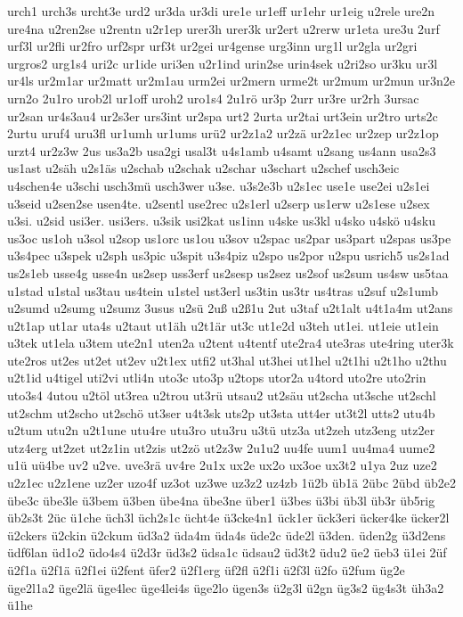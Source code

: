 {urch1
urch3s
urcht3e
urd2
ur3da
ur3di
ure1e
ur1eff
ur1ehr
ur1eig
u2rele
ure2n
ure4na
u2ren2se
u2rentn
u2r1ep
urer3h
urer3k
ur2ert
u2rerw
ur1eta
ure3u
2urf
urf3l
ur2fli
ur2fro
urf2spr
urf3t
ur2gei
ur4gense
urg3inn
urg1l
ur2gla
ur2gri
urgros2
urg1s4
uri2c
ur1ide
uri3en
u2r1ind
urin2se
urin4sek
u2ri2so
ur3ku
ur3l
ur4ls
ur2m1ar
ur2matt
ur2m1au
urm2ei
ur2mern
urme2t
ur2mum
ur2mun
ur3n2e
urn2o
2u1ro
urob2l
ur1off
uroh2
uro1s4
2u1rö
ur3p
2urr
ur3re
ur2rh
3ursac
ur2san
ur4s3au4
ur2s3er
urs3int
ur2spa
urt2
2urta
ur2tai
urt3ein
ur2tro
urts2c
2urtu
uruf4
uru3fl
ur1umh
ur1ums
urü2
ur2z1a2
ur2zä
ur2z1ec
ur2zep
ur2z1op
urzt4
ur2z3w
2us
us3a2b
usa2gi
usal3t
u4s1amb
u4samt
u2sang
us4ann
usa2s3
us1ast
u2säh
u2s1äs
u2schab
u2schak
u2schar
u3schart
u2schef
usch3eic
u4schen4e
u3schi
usch3mü
usch3wer
u3se.
u3s2e3b
u2s1ec
use1e
use2ei
u2s1ei
u3seid
u2sen2se
usen4te.
u2sentl
use2rec
u2s1erl
u2serp
us1erw
u2s1ese
u2sex
u3si.
u2sid
usi3er.
usi3ers.
u3sik
usi2kat
us1inn
u4ske
us3kl
u4sko
u4skö
u4sku
us3oc
us1oh
u3sol
u2sop
us1orc
us1ou
u3sov
u2spac
us2par
us3part
u2spas
us3pe
u3s4pec
u3spek
u2sph
us3pic
u3spit
u3s4piz
u2spo
us2por
u2spu
usrich5
us2s1ad
us2s1eb
usse4g
usse4n
us2sep
uss3erf
us2sesp
us2sez
us2sof
us2sum
us4sw
us5taa
u1stad
u1stal
us3tau
us4tein
u1stel
ust3erl
us3tin
us3tr
us4tras
u2suf
u2s1umb
u2sumd
u2sumg
u2sumz
3usus
u2sü
2uß
u2ß1u
2ut
u3taf
u2t1alt
u4t1a4m
ut2ans
u2t1ap
ut1ar
uta4s
u2taut
ut1äh
u2t1är
ut3c
ut1e2d
u3teh
ut1ei.
ut1eie
ut1ein
u3tek
ut1ela
u3tem
ute2n1
uten2a
u2tent
u4tentf
ute2ra4
ute3ras
ute4ring
uter3k
ute2ros
ut2es
ut2et
ut2ev
u2t1ex
utfi2
ut3hal
ut3hei
ut1hel
u2t1hi
u2t1ho
u2thu
u2t1id
u4tigel
uti2vi
utli4n
uto3c
uto3p
u2tops
utor2a
u4tord
uto2re
uto2rin
uto3s4
4utou
u2töl
ut3rea
u2trou
ut3rü
utsau2
ut2säu
ut2scha
ut3sche
ut2schl
ut2schm
ut2scho
ut2schö
ut3ser
u4t3sk
uts2p
ut3sta
utt4er
ut3t2l
utts2
utu4b
u2tum
utu2n
u2t1une
utu4re
utu3ro
utu3ru
u3tü
utz3a
ut2zeh
utz3eng
utz2er
utz4erg
ut2zet
ut2z1in
ut2zis
ut2zö
ut2z3w
2u1u2
uu4fe
uum1
uu4ma4
uume2
u1ü
uü4be
uv2
u2ve.
uve3rä
uv4re
2u1x
ux2e
ux2o
ux3oe
ux3t2
u1ya
2uz
uze2
u2z1ec
u2z1ene
uz2er
uzo4f
uz3ot
uz3we
uz3z2
uz4zb
1ü2b
üb1ä
2übc
2übd
üb2e2
übe3c
übe3le
ü3bem
ü3ben
übe4na
übe3ne
über1
ü3bes
ü3bi
üb3l
üb3r
üb5rig
üb2s3t
2üc
ü1che
üch3l
üch2s1c
ücht4e
ü3cke4n1
ück1er
ück3eri
ücker4ke
ücker2l
ü2ckers
ü2ckin
ü2ckum
üd3a2
üda4m
üda4s
üde2c
üde2l
ü3den.
üden2g
ü3d2ens
üdf6lan
üd1o2
üdo4s4
ü2d3r
üd3s2
üdsa1c
üdsau2
üd3t2
üdu2
üe2
üeb3
ü1ei
2üf
ü2f1a
ü2f1ä
ü2f1ei
ü2fent
üfer2
ü2f1erg
üf2fl
ü2f1i
ü2f3l
ü2fo
ü2fum
üg2e
üge2l1a2
üge2lä
üge4lec
üge4lei4s
üge2lo
ügen3s
ü2g3l
ü2gn
üg3s2
üg4s3t
üh3a2
ü1he
}
